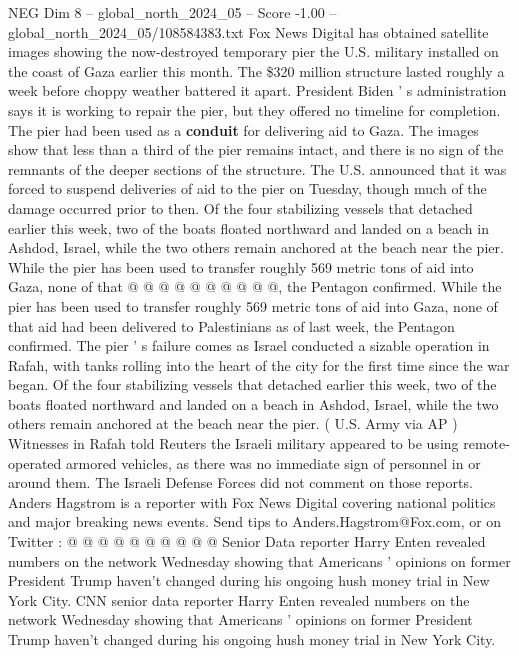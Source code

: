 \begin{textsample}{NEG Dim 8 – global\_north\_2024\_05 – Score -1.00 – global\_north\_2024\_05/108584383.txt}  \label{ex:f8_neg_274}
Fox News Digital has obtained satellite images showing the now-destroyed temporary pier the U.S. military installed on the coast of Gaza earlier this month.
The \$320 million structure lasted roughly a week before choppy weather battered it apart.
President Biden ' s administration says it is working to repair the pier, but they offered no timeline for completion.
The pier had been used as a \textbf{conduit} for delivering aid to Gaza.
The images show that less than a third of the pier remains intact, and there is no sign of the remnants of the deeper sections of the structure.
The U.S. announced that it was forced to suspend deliveries of aid to the pier on Tuesday, though much of the damage occurred prior to then.
Of the four stabilizing vessels that detached earlier this week, two of the boats floated northward and landed on a beach in Ashdod, Israel, while the two others remain anchored at the beach near the pier.
While the pier has been used to transfer roughly 569 metric tons of aid into Gaza, none of that @ @ @ @ @ @ @ @ @ @, the Pentagon confirmed.
While the pier has been used to transfer roughly 569 metric tons of aid into Gaza, none of that aid had been delivered to Palestinians as of last week, the Pentagon confirmed.
The pier ' s failure comes as Israel conducted a sizable operation in Rafah, with tanks rolling into the heart of the city for the first time since the war began.
Of the four stabilizing vessels that detached earlier this week, two of the boats floated northward and landed on a beach in Ashdod, Israel, while the two others remain anchored at the beach near the pier. ( U.S.
Army via AP ) Witnesses in Rafah told Reuters the Israeli military appeared to be using remote-operated armored vehicles, as there was no immediate sign of personnel in or around them.
The Israeli Defense Forces did not comment on those reports.
Anders Hagstrom is a reporter with Fox News Digital covering national politics and major breaking news events.
Send tips to Anders.Hagstrom@Fox.com, or on Twitter : @ @ @ @ @ @ @ @ @ @ Senior Data reporter Harry Enten revealed numbers on the network Wednesday showing that Americans ' opinions on former President Trump haven't changed during his ongoing hush money trial in New York City.
CNN senior data reporter Harry Enten revealed numbers on the network Wednesday showing that Americans ' opinions on former President Trump haven't changed during his ongoing hush money trial in New York City.

\end{textsample}
